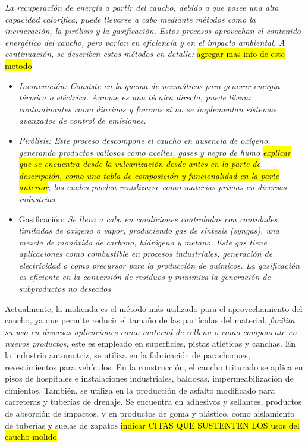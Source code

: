 \textit{La recuperación de energía a partir del caucho, debido a que posee una alta capacidad calorifica, puede llevarse a cabo mediante métodos como la incineración, la pirólisis y la gasificación. Estos procesos aprovechan el contenido energético del caucho, pero varían en eficiencia y en el impacto ambiental. A continuación, se describen estos métodos en detalle:} \hl{agregar mas info de este metodo}

\begin{itemize}
  \item \textit{ Incineración: Consiste en la quema de neumáticos para generar energía térmica o eléctrica. Aunque es una técnica directa, puede liberar contaminantes como dioxinas y furanos si no se implementan sistemas avanzados de control de emisiones. }
 \item  \textit{ Pirólisis: Este proceso descompone el caucho en ausencia de oxígeno, generando productos valiosos como aceites, gases y negro de humo \hl{explicar que se encuentra desde la vulcanización desde antes en la parte de descripción, como una tabla de composición y funcionalidad en la parte anterior}, los cuales pueden reutilizarse como materias primas en diversas industrias.}
 \item Gasificación:\textit{ Se lleva a cabo en condiciones controladas con cantidades limitadas de oxígeno o vapor, produciendo gas de síntesis (syngas), una mezcla de monóxido de carbono, hidrógeno y metano. Este gas tiene aplicaciones como combustible en procesos industriales, generación de electricidad o como precursor para la producción de químicos. La gasificación es eficiente en la conversión de residuos y minimiza la generación de subproductos no deseados}

\end{itemize}

Actualmente, la molienda es el método más utilizado para el aprovechamiento del caucho, ya que permite reducir el tamaño de las partículas del material, \textit{ facilita su uso en diversas aplicaciones como material de relleno o como componente en nuevos productos}, este es empleado en superficies, pistas atléticas y canchas. En la industria automotriz, se utiliza en la fabricación de parachoques,  revestimientos para vehículos. En la construcción, el caucho triturado se aplica en pisos de hospitales e instalaciones industriales, baldosas, impermeabilización de cimientos. También, se utiliza en la producción de asfalto modificado para carreteras y tuberías de drenaje. Se encuentra en adhesivos y sellantes, productos de absorción de impactos, y en productos de goma y plástico, como aislamiento de tuberías y suelas de zapatos \hl{indicar CITAS QUE SUSTENTEN LOS usos del caucho molido}.  

